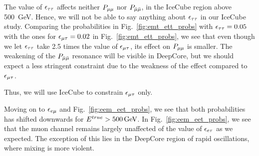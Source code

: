 The value of $\epsilon_{\tau\tau}$ affects neither $P_{\mu\mu}$ nor $P_{\bar{\mu} \bar{\mu}}$, in the IceCube region above \SI{500}{\GeV}. Hence, we will not be able
to say anything about $\epsilon_{\tau\tau}$ in our IceCube study.  Comparing the probabilities in Fig.~\ref{fig:emt_ett_probs} with $\epsilon_{\tau\tau} = 0.05$ with the ones for $\epsilon_{\mu\tau} = 0.02$ in Fig.~\ref{fig:emt_ett_probs},
we see that even though we let $\epsilon_{\tau\tau}$ take 2.5 times the value of $\epsilon_{\mu\tau}$, its effect on $P_{\mu\mu}$ is smaller. The weakening of the $P_{\bar{\mu} \bar{\mu}}$ resonance will be visible in DeepCore, but we should expect a less stringent 
constraint due to the weakness of the effect compared to $\epsilon_{\mu\tau}$. 

Thus, we will use IceCube to constrain $\epsilon_{\mu\tau}$ only.


Moving on to $\epsilon_{e\mu}$ and Fig.~\ref{fig:eem_eet_probs}, we see that both probabilities has shifted downwards for $\Etrue > \SI{500}{\GeV}$.
In Fig.~\ref{fig:eem_eet_probs}, we see that the muon channel remains largely unaffected of the value of $\epsilon_{e\tau}$ as we expected. The exception of this lies 
in the DeepCore region of rapid oscillations, where mixing is more violent. 
